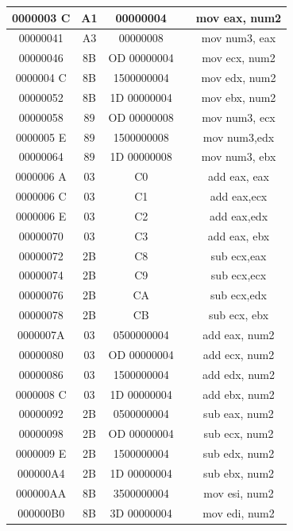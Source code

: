 \documentclass[10pt]{book}
\begin{document}
\begin{center}
\begin{tabular}{|c|c|c|c|c|}
\hline
0000003 C & A1 & 00000004 &  & mov eax, num2 \\
\hline
00000041 & A3 & 00000008 &  & mov num3, eax \\
\hline
00000046 & 8B & OD 00000004 &  & mov ecx, num2 \\

\hline
0000004 C & 8B & 1500000004 &  & mov edx, num2 \\
\hline
00000052 & 8B & 1D 00000004 &  & mov ebx, num2 \\
\hline
00000058 & 89 & OD 00000008 &  & mov num3, ecx \\
\hline
0000005 E & 89 & 1500000008 &  & mov num3,edx \\
\hline
00000064 & 89 & 1D 00000008 &  & mov num3, ebx \\
\hline
0000006 A & 03 & C0 &  & add eax, eax \\
\hline
0000006 C & 03 & C1 &  & add eax,ecx \\
\hline
0000006 E & 03 & C2 &  & add eax,edx \\
\hline
00000070 & 03 & C3 &  & add eax, ebx \\
\hline
00000072 & 2B & C8 &  & sub ecx,eax \\
\hline
00000074 & 2B & C9 &  & sub ecx,ecx \\
\hline
00000076 & 2B & CA &  & sub ecx,edx \\
\hline
00000078 & 2B & CB &  & sub ecx, ebx \\
\hline
0000007A & 03 & 0500000004 &  & add eax, num2 \\
\hline
00000080 & 03 & OD 00000004 &  & add ecx, num2 \\
\hline
00000086 & 03 & 1500000004 &  & add edx, num2 \\
\hline
0000008 C & 03 & 1D 00000004 &  & add ebx, num2 \\
\hline
00000092 & 2B & 0500000004 &  & sub eax, num2 \\
\hline
00000098 & 2B & OD 00000004 &  & sub ecx, num2 \\
\hline
0000009 E & 2B & 1500000004 &  & sub edx, num2 \\
\hline
000000A4 & 2B & 1D 00000004 &  & sub ebx, num2 \\
\hline
000000AA & 8B & 3500000004 &  & mov esi, num2 \\
\hline
000000B0 & 8B & 3D 00000004 &  & mov edi, num2 \\

\end{tabular}
\end{center}
\end{document}
